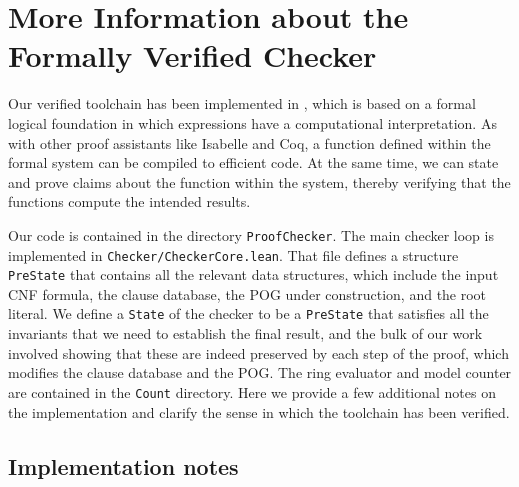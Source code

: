 \section{More Information about the Formally Verified Checker}
\label{appendix:lean}

Our verified toolchain has been implemented in \lean{}, which is based on
a formal logical foundation in which expressions
have a computational interpretation.
As with other proof assistants like Isabelle and Coq,
a function defined within the formal system can be compiled to efficient code.
At the same time, we can state and prove claims about the function within the system, thereby verifying that the functions compute the intended results.

Our code is contained in the directory {\tt ProofChecker}.
The main checker loop is implemented in {\tt Checker/CheckerCore.lean}.
That file defines a structure {\tt PreState} that contains all the
relevant data structures, which include
the input CNF formula,
the clause database,
the POG under construction,
and the root literal.
We define a {\tt State} of the checker to be a {\tt PreState}
that satisfies all the invariants that we need to establish
the final result,
and the bulk of our work involved showing that
these are indeed preserved by each step of the proof, which
modifies the clause database and the POG.
The ring evaluator and model counter are contained in the
{\tt Count} directory.
Here we provide a few additional notes on the implementation
and clarify the sense in which the toolchain has been verified.

\subsection{Implementation notes}

